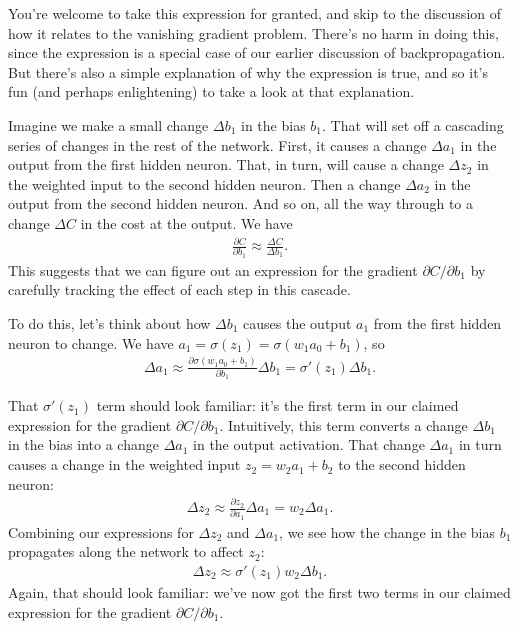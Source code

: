 \documentclass[a4paper,twoside,10pt]{book}
\begin{document}
You're welcome to take this expression for granted, and skip to the discussion of how it relates to the vanishing gradient problem. There's no harm in doing this, since the expression is a special case of our earlier discussion of backpropagation. But there's also a simple explanation of why the expression is true, and so it's fun (and perhaps enlightening) to take a look at that explanation.

Imagine we make a small change $\Delta b_1$ in the bias $b_1$. That will set off a cascading series of changes in the rest of the network. First, it causes a change $\Delta a_1$ in the output from the first hidden neuron. That, in turn, will cause a change $\Delta z_2$ in the weighted input to the second hidden neuron. Then a change $\Delta a_2$ in the output from the second hidden neuron. And so on, all the way through to a change $\Delta C$ in the cost at the output. We have
\begin{align}
\frac{\partial C}{\partial b_1} \approx \frac{\Delta C}{\Delta b_1}.\tag{114}\label{eq:114}
\end{align}
This suggests that we can figure out an expression for the gradient $\partial C/\partial b_1$ by carefully tracking the effect of each step in this cascade.

To do this, let's think about how $\Delta b_1$ causes the output $a_1$ from the first hidden neuron to change. We have $a_1=\sigma(z_1)=\sigma(w_1a_0+b_1)$, so
\begin{align}
\Delta a_1 \approx \frac{\partial \sigma(w_1 a_0+b_1)}{\partial b_1} \Delta b_1 = \sigma'(z_1) \Delta b_1. \tag{116}\label{eq:116}
\end{align}

That $\sigma'(z_1)$ term should look familiar: it's the first term in our claimed expression for the gradient $\partial C/\partial b_1$. Intuitively, this term converts a change $\Delta b_1$ in the bias into a change $\Delta a_1$ in the output activation. That change $\Delta a_1$ in turn causes a change in the weighted input $z_2=w_2a_1+b_2$ to the second hidden neuron:
\begin{align}
\Delta z_2  \approx \frac{\partial z_2}{\partial a_1} \Delta a_1 =  w_2 \Delta a_1. \tag{118}\label{eq:118}
\end{align}
Combining our expressions for $\Delta z_2$ and $\Delta a_1$, we see how the change in the bias $b_1$ propagates along the network to affect $z_2$:
\begin{align}
\Delta z_2 \approx \sigma'(z_1) w_2 \Delta b_1.\tag{119}\label{eq:119}
\end{align}
Again, that should look familiar: we've now got the first two terms in our claimed expression for the gradient $\partial C/\partial b_1$.
\end{document}
